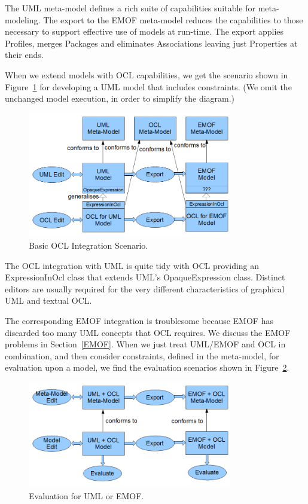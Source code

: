 \documentclass{eceasst}
\begin{document}
The UML meta-model defines a rich suite of capabilities suitable for meta-modeling. The export to the EMOF meta-model reduces the capabilities to those necessary to support effective use of models at run-time. The export applies Profiles, merges Packages and eliminates Associations leaving just Properties at their ends.

When we extend models with OCL capabilities, we get the scenario shown in Figure~\ref{fig:BasicOCLScenario} for developing a UML model that includes constraints. (We omit the unchanged model execution, in order to simplify the diagram.) 

\begin{figure}
  \begin{center}
    \includegraphics[width=3.5in]{BasicOCLScenario.png}
  \end{center}
  \caption{Basic OCL Integration Scenario.}
  \label{fig:BasicOCLScenario}
\end{figure}

The OCL integration with UML is quite tidy with OCL providing an ExpressionInOcl class that extends UML's OpaqueExpression class. Distinct editors are usually required for the very different characteristics of graphical UML and textual OCL.

The corresponding EMOF integration is troublesome because EMOF has discarded too many UML concepts that OCL requires. 
We discuss the EMOF problems in Section~\ref{EMOF}. When we just treat UML/EMOF and OCL in combination, and then consider constraints, defined in the meta-model, for evaluation upon a model, we find the evaluation scenarios shown in Figure~\ref{fig:M2Evaluation}.

\begin{figure}
  \begin{center}
    \includegraphics[width=3.5in]{M2Evaluation.png}
  \end{center}
  \caption{Evaluation for UML or EMOF.}
  \label{fig:M2Evaluation}
\end{figure}
\end{document}
